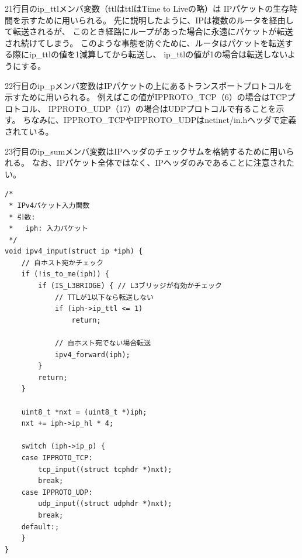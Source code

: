 21行目のip\_ttlメンバ変数（ttlはttlはTime to Liveの略）は
IPパケットの生存時間を示すために用いられる。
先に説明したように、IPは複数のルータを経由して転送されるが、
このとき経路にループがあった場合に永遠にパケットが転送され続けてしまう。
このような事態を防ぐために、ルータはパケットを転送する際にip\_ttlの値を1減算してから転送し、
ip\_ttlの値が1の場合は転送しないようにする。

22行目のip\_pメンバ変数はIPパケットの上にあるトランスポートプロトコルを示すために用いられる。
例えばこの値がIPPROTO\_TCP（6）の場合はTCPプロトコル、
IPPROTO\_UDP（17）の場合はUDPプロトコルで有ることを示す。
ちなみに、IPPROTO\_TCPやIPPROTO\_UDPはnetinet/in.hヘッダで定義されている。

23行目のip\_sumメンバ変数はIPヘッダのチェックサムを格納するために用いられる。
なお、IPパケット全体ではなく、IPヘッダのみであることに注意されたい。


\begin{lstlisting}[caption=ipv4\_input関数,label=src:ipv4_input]
/*
 * IPv4パケット入力関数
 * 引数:
 *   iph: 入力パケット
 */
void ipv4_input(struct ip *iph) {
    // 自ホスト宛かチェック
    if (!is_to_me(iph)) {
        if (IS_L3BRIDGE) { // L3ブリッジが有効かチェック
            // TTLが1以下なら転送しない
            if (iph->ip_ttl <= 1)
                return;

            // 自ホスト宛でない場合転送
            ipv4_forward(iph);
        }
        return;
    }

    uint8_t *nxt = (uint8_t *)iph;
    nxt += iph->ip_hl * 4;

    switch (iph->ip_p) {
    case IPPROTO_TCP:
        tcp_input((struct tcphdr *)nxt);
        break;
    case IPPROTO_UDP:
        udp_input((struct udphdr *)nxt);
        break;
    default:;
    }
}
\end{lstlisting}

